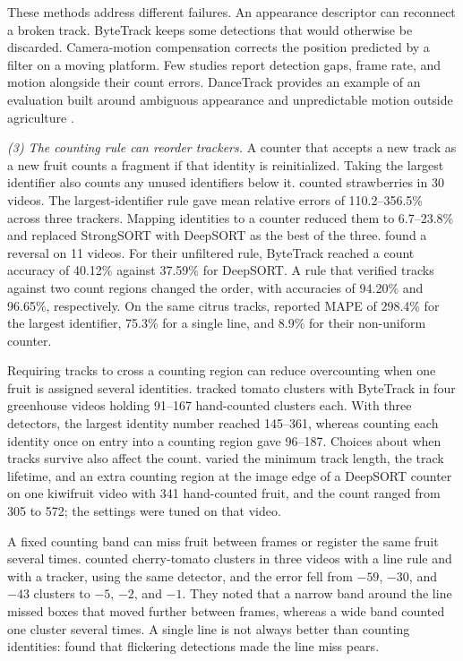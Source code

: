 These methods address different failures. An appearance descriptor can reconnect a broken track. ByteTrack keeps some detections that would otherwise be discarded. Camera-motion compensation corrects the position predicted by a filter on a moving platform. Few studies report detection gaps, frame rate, and motion alongside their count errors. DanceTrack provides an example of an evaluation built around ambiguous appearance and unpredictable motion outside agriculture \citep{sun2022dancetrack}.

\textit{(3) The counting rule can reorder trackers.} A counter that accepts a new track as a new fruit counts a fragment if that identity is reinitialized. Taking the largest identifier also counts any unused identifiers below it. \citet{zhou2024advancing} counted strawberries in 30 videos. The largest-identifier rule gave mean relative errors of 110.2--356.5\% across three trackers. Mapping identities to a counter reduced them to 6.7--23.8\% and replaced StrongSORT with DeepSORT as the best of the three. \citet{zhang2025row} found a reversal on 11 videos. For their unfiltered rule, ByteTrack reached a count accuracy of 40.12\% against 37.59\% for DeepSORT. A rule that verified tracks against two count regions changed the order, with accuracies of 94.20\% and 96.65\%, respectively. On the same citrus tracks, \citet{zheng2023efficient} reported MAPE of 298.4\% for the largest identifier, 75.3\% for a single line, and 8.9\% for their non-uniform counter.

Requiring tracks to cross a counting region can reduce overcounting when one fruit is assigned several identities. \citet{rong2023tomato} tracked tomato clusters with ByteTrack in four greenhouse videos holding 91--167 hand-counted clusters each. With three detectors, the largest identity number reached 145--361, whereas counting each identity once on entry into a counting region gave 96--187. Choices about when tracks survive also affect the count. \citet{ripa2022orchard} varied the minimum track length, the track lifetime, and an extra counting region at the image edge of a DeepSORT counter on one kiwifruit video with 341 hand-counted fruit, and the count ranged from 305 to 572; the settings were tuned on that video.

A fixed counting band can miss fruit between frames or register the same fruit several times. \citet{tenorio2021automatic} counted cherry-tomato clusters in three videos with a line rule and with a tracker, using the same detector, and the error fell from $-59$, $-30$, and $-43$ clusters to $-5$, $-2$, and $-1$. They noted that a narrow band around the line missed boxes that moved further between frames, whereas a wide band counted one cluster several times. A single line is not always better than counting identities: \citet{parico2021real} found that flickering detections made the line miss pears.

